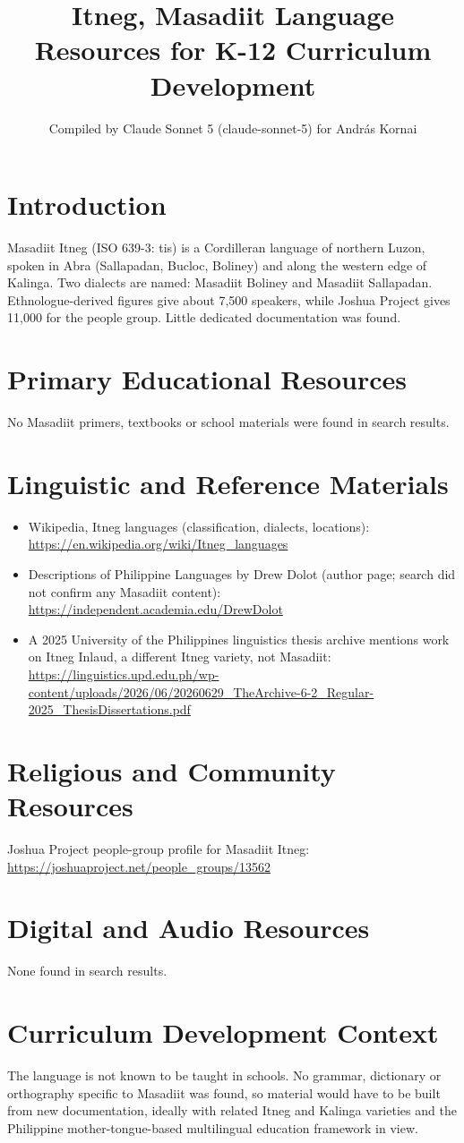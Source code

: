\documentclass[12pt]{article}
\title{Itneg, Masadiit Language Resources for K-12 Curriculum Development}
\author{Compiled by Claude Sonnet 5 (claude-sonnet-5) for Andr\'as Kornai}
\date{}
\begin{document}
\maketitle

\section{Introduction}
Masadiit Itneg (ISO 639-3: tis) is a Cordilleran language of northern Luzon, spoken in Abra (Sallapadan, Bucloc, Boliney) and along the western edge of Kalinga. Two dialects are named: Masadiit Boliney and Masadiit Sallapadan. Ethnologue-derived figures give about 7,500 speakers, while Joshua Project gives 11,000 for the people group. Little dedicated documentation was found.

\section{Primary Educational Resources}
No Masadiit primers, textbooks or school materials were found in search results.

\section{Linguistic and Reference Materials}
\begin{itemize}
\item Wikipedia, Itneg languages (classification, dialects, locations): \url{https://en.wikipedia.org/wiki/Itneg_languages}
\item Descriptions of Philippine Languages by Drew Dolot (author page; search did not confirm any Masadiit content): \url{https://independent.academia.edu/DrewDolot}
\item A 2025 University of the Philippines linguistics thesis archive mentions work on Itneg Inlaud, a different Itneg variety, not Masadiit: \url{https://linguistics.upd.edu.ph/wp-content/uploads/2026/06/20260629_TheArchive-6-2_Regular-2025_ThesisDissertations.pdf}
\end{itemize}

\section{Religious and Community Resources}
Joshua Project people-group profile for Masadiit Itneg: \url{https://joshuaproject.net/people_groups/13562}

\section{Digital and Audio Resources}
None found in search results.

\section{Curriculum Development Context}
The language is not known to be taught in schools. No grammar, dictionary or orthography specific to Masadiit was found, so material would have to be built from new documentation, ideally with related Itneg and Kalinga varieties and the Philippine mother-tongue-based multilingual education framework in view.
\end{document}
